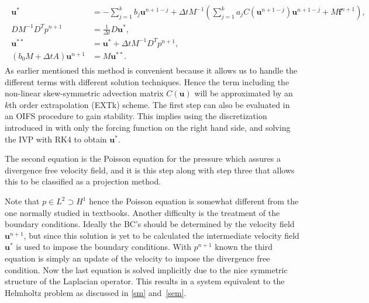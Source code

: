 \begin{align}
    \begin{split}
        \mathbf{u}^{*} &= -\sum_{j=1}^kb_{j}\mathbf{u}^{n+1-j}
        +\Delta t M^{-1} (\sum_{j=1}^ka_{j}C(\mathbf{u}^{n+1-j})\mathbf{u}^{n+1-j}
        +M\mathbf{f}^{n+1}),\\
        DM^{-1}D^T p^{n+1} &= \frac{1}{\Delta t}D \mathbf{u}^{*} ,\\
        \mathbf{u}^{**} &= \mathbf{u}^{*} + \Delta t M^{-1}D^T p^{n+1},\\
        (b_0M+\Delta t A)\mathbf{u}^{n+1} &= M\mathbf{u}^{**}.
    \end{split}
    \label{eq:fracstep}
\end{align}
%
As earlier mentioned this method is convenient because it allows us to handle the different 
terms with different solution techniques. Hence the term including the
non-linear skew-symmetric advection matrix $C(\mathbf{u})$ will be approximated by
an $k$th order extrapolation (EXTk) scheme. The first step can also be evaluated in 
an OIFS procedure to gain stability. This implies using the discretization introduced in 
with only the forcing function on the right hand side, and solving the
IVP  with RK4 to obtain $\mathbf{u}^{*}$. 

The second equation is the Poisson equation for the pressure which
assures a divergence free velocity field, and it is this step along with step three that 
allows this to be classified as a projection method.

Note that $p\in L^2\supset H^1$ hence the Poisson equation 
is somewhat different from the one normally studied in textbooks. Another difficulty is the 
treatment of the boundary conditions. Ideally the BC's should be determined by the velocity 
field $\mathbf{u}^{n+1}$, but since this solution is yet to be calculated the intermediate velocity field 
$\mathbf{u}^{*}$ is used to impose the boundary conditions. With $p^{n+1}$ known the third equation is 
simply an update of the velocity to impose the divergence free condition. Now the last
equation is solved implicitly due to the nice symmetric structure of the Laplacian operator.
This results in a system equivalent to the Helmholtz problem as discussed in 
\cref{sm} and~\ref{sem}.

